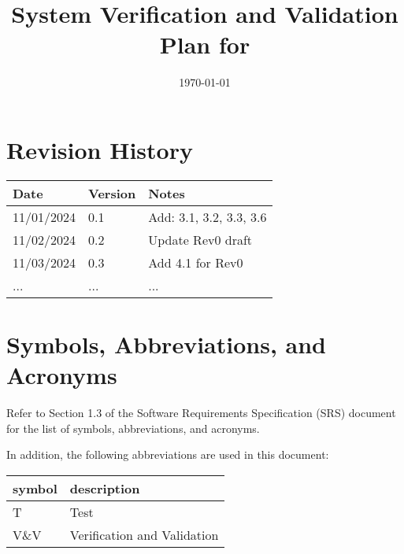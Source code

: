 \documentclass[12pt, titlepage]{article}
\begin{document}
\title{System Verification and Validation Plan for \progname{}} 
\author{\authname}
\date{\today}
	
\maketitle


\section*{Revision History}

\begin{tabularx}{\textwidth}{p{3cm}p{2cm}X}
\toprule {\bf Date} & {\bf Version} & {\bf Notes}\\
\midrule
11/01/2024 & 0.1 & Add: 3.1, 3.2, 3.3, 3.6\\
11/02/2024 & 0.2 & Update Rev0 draft\\
11/03/2024 & 0.3 & Add 4.1 for Rev0\\
... & ... & ...\\
\bottomrule
\end{tabularx}

\newpage

\tableofcontents

\newpage

\section{Symbols, Abbreviations, and Acronyms}

Refer to Section 1.3 of the Software Requirements Specification (SRS) document
for the list of symbols, abbreviations, and acronyms.

In addition, the following abbreviations are used in this document:\\

\renewcommand{\arraystretch}{1.2}
\begin{tabular}{l l} 
  \toprule		
  \textbf{symbol} & \textbf{description}\\
  \midrule 
  T & Test\\
  V\&V & Verification and Validation\\
  \bottomrule
\end{tabular}\\

\newpage

\end{document}
